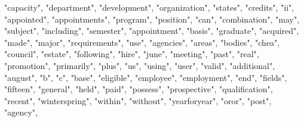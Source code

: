 \documentclass[]{article}
\newenvironment{Shaded}{\begin{snugshade}}{\end{snugshade}}
\newcommand{\NormalTok}[1]{#1}
\newcommand{\StringTok}[1]{\textcolor[rgb]{0.31,0.60,0.02}{#1}}
\begin{document}
\begin{Shaded}
\begin{Highlighting}[]
{{{{{{{{{{                       \StringTok{"capacity"}\NormalTok{, }\StringTok{"department"}\NormalTok{, }\StringTok{"development"}\NormalTok{, }\StringTok{"organization"}\NormalTok{,}
                       \StringTok{"states"}\NormalTok{, }\StringTok{"credits"}\NormalTok{, }\StringTok{"ii"}\NormalTok{, }\StringTok{"appointed"}\NormalTok{, }\StringTok{"appointments"}\NormalTok{,}
                       \StringTok{"program"}\NormalTok{, }\StringTok{"position"}\NormalTok{, }\StringTok{"can"}\NormalTok{, }\StringTok{"combination"}\NormalTok{, }\StringTok{"may"}\NormalTok{,}
                       \StringTok{"subject"}\NormalTok{, }\StringTok{"including"}\NormalTok{, }\StringTok{"semester"}\NormalTok{, }\StringTok{"appointment"}\NormalTok{, }\StringTok{"basis"}\NormalTok{,}
                       \StringTok{"graduate"}\NormalTok{, }\StringTok{"acquired"}\NormalTok{, }\StringTok{"made"}\NormalTok{, }\StringTok{"major"}\NormalTok{, }\StringTok{"requirements"}\NormalTok{,}
                       \StringTok{"use"}\NormalTok{, }\StringTok{"agencies"}\NormalTok{, }\StringTok{"areas"}\NormalTok{, }\StringTok{"bodies"}\NormalTok{, }\StringTok{"chea"}\NormalTok{, }\StringTok{"council"}\NormalTok{,}
                       \StringTok{"estate"}\NormalTok{, }\StringTok{"following"}\NormalTok{, }\StringTok{"hire"}\NormalTok{, }\StringTok{"june"}\NormalTok{, }\StringTok{"meeting"}\NormalTok{, }\StringTok{"past"}\NormalTok{,}
                       \StringTok{"real"}\NormalTok{, }\StringTok{"promotion"}\NormalTok{, }\StringTok{"primarily"}\NormalTok{, }\StringTok{"plus"}\NormalTok{, }\StringTok{"us"}\NormalTok{, }\StringTok{"using"}\NormalTok{,}
                       \StringTok{"user"}\NormalTok{, }\StringTok{"valid"}\NormalTok{, }\StringTok{"additional"}\NormalTok{, }\StringTok{"august"}\NormalTok{, }\StringTok{"b"}\NormalTok{, }\StringTok{"c"}\NormalTok{, }\StringTok{"base"}\NormalTok{,}
                       \StringTok{"eligible"}\NormalTok{, }\StringTok{"employee"}\NormalTok{, }\StringTok{"employment"}\NormalTok{, }\StringTok{"end"}\NormalTok{, }\StringTok{"fields"}\NormalTok{,}
                       \StringTok{"fifteen"}\NormalTok{, }\StringTok{"general"}\NormalTok{, }\StringTok{"held"}\NormalTok{, }\StringTok{"paid"}\NormalTok{, }\StringTok{"possess"}\NormalTok{,}
                       \StringTok{"prospective"}\NormalTok{, }\StringTok{"qualification"}\NormalTok{, }\StringTok{"recent"}\NormalTok{, }\StringTok{"winterspring"}\NormalTok{,}
                       \StringTok{"within"}\NormalTok{, }\StringTok{"without"}\NormalTok{, }\StringTok{"yearforyear"}\NormalTok{, }\StringTok{"oror"}\NormalTok{, }\StringTok{"post"}\NormalTok{, }\StringTok{"agency"}\NormalTok{,}
}}}}}}}}}}
\end{Highlighting}
\end{Shaded}
\end{document}
